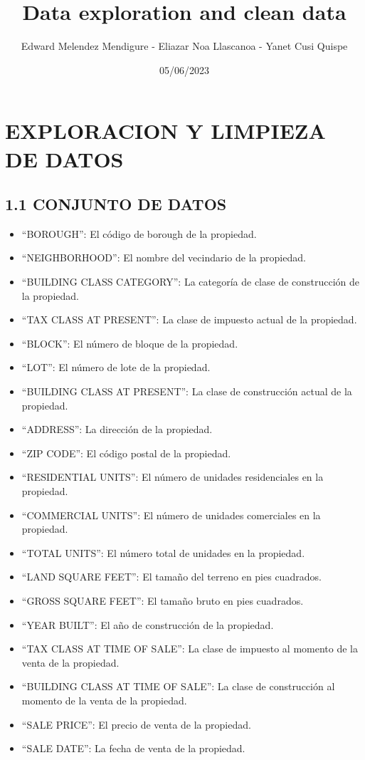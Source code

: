 \documentclass[
]{article}
\title{Data exploration and clean data}
\author{Edward Melendez Mendigure - Eliazar Noa Llascanoa - Yanet Cusi
Quispe}
\date{05/06/2023}
\providecommand{\tightlist}{%
  \setlength{\itemsep}{0pt}\setlength{\parskip}{0pt}}
\begin{document}
\maketitle

{
\setcounter{tocdepth}{2}
\tableofcontents
}
\hypertarget{exploracion-y-limpieza-de-datos}{%
\section{EXPLORACION Y LIMPIEZA DE
DATOS}\label{exploracion-y-limpieza-de-datos}}

\hypertarget{conjunto-de-datos}{%
\subsection{1.1 CONJUNTO DE DATOS}\label{conjunto-de-datos}}

\begin{itemize}
\tightlist
\item
  ``BOROUGH'': El código de borough de la propiedad.
\item
  ``NEIGHBORHOOD'': El nombre del vecindario de la propiedad.
\item
  ``BUILDING CLASS CATEGORY'': La categoría de clase de construcción de
  la propiedad.
\item
  ``TAX CLASS AT PRESENT'': La clase de impuesto actual de la propiedad.
\item
  ``BLOCK'': El número de bloque de la propiedad.
\item
  ``LOT'': El número de lote de la propiedad.
\item
  ``BUILDING CLASS AT PRESENT'': La clase de construcción actual de la
  propiedad.
\item
  ``ADDRESS'': La dirección de la propiedad.
\item
  ``ZIP CODE'': El código postal de la propiedad.
\item
  ``RESIDENTIAL UNITS'': El número de unidades residenciales en la
  propiedad.
\item
  ``COMMERCIAL UNITS'': El número de unidades comerciales en la
  propiedad.
\item
  ``TOTAL UNITS'': El número total de unidades en la propiedad.
\item
  ``LAND SQUARE FEET'': El tamaño del terreno en pies cuadrados.
\item
  ``GROSS SQUARE FEET'': El tamaño bruto en pies cuadrados.
\item
  ``YEAR BUILT'': El año de construcción de la propiedad.
\item
  ``TAX CLASS AT TIME OF SALE'': La clase de impuesto al momento de la
  venta de la propiedad.
\item
  ``BUILDING CLASS AT TIME OF SALE'': La clase de construcción al
  momento de la venta de la propiedad.
\item
  ``SALE PRICE'': El precio de venta de la propiedad.
\item
  ``SALE DATE'': La fecha de venta de la propiedad.
\end{itemize}
\end{document}
